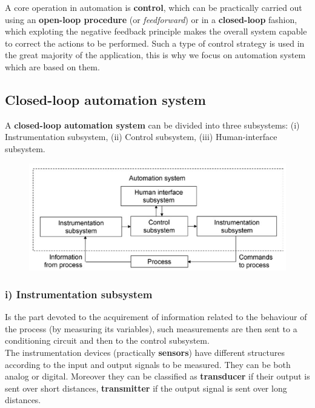 A core operation in automation is \textbf{control}, which can be practically carried out using an \textbf{open-loop procedure} (or \textit{feedforward}) or in a \textbf{closed-loop} fashion, which exploting the negative feedback principle makes the overall system capable to correct the actions to be performed. Such a type of control strategy is used in the great majority of the application, this is why we focus on automation system which are based on them.

\subsection{Closed-loop automation system}
A \textbf{closed-loop automation system} can be divided into three subsystems: (i) Instrumentation subsystem, (ii) Control subsystem, (iii) Human-interface subsystem.

\begin{figure}[h]
    \centering
    \includegraphics[scale=0.5]{img/closed_loop_automation.png}
\end{figure}

\subsubsection{i) Instrumentation subsystem}
Is the part devoted to the acquirement of information related to the behaviour of the process (by measuring its variables), such measurements are then sent to a conditioning circuit and then to the control subsystem. \\ 
The instrumentation devices (practically \textbf{sensors}) have different structures according to the input and output signals to be measured. They can be both analog or digital. Moreover they can be classified as \textbf{transducer} if their output is sent over short distances, \textbf{transmitter} if the output signal is sent over long distances.

